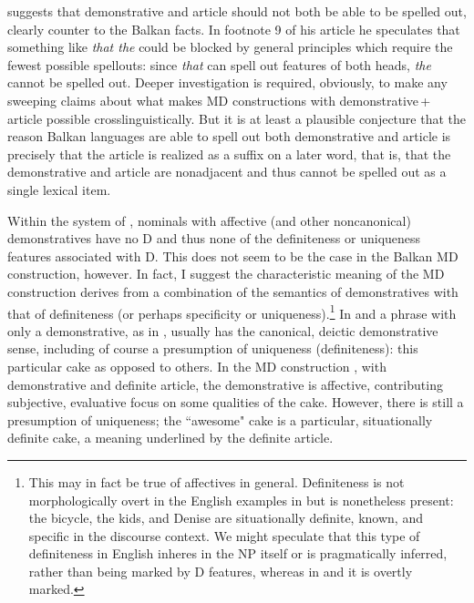 \documentclass[output=paper]{langscibook}
\begin{document}
\citet{Simik2016} suggests that demonstrative and article should not both be able to be spelled out, clearly counter to the Balkan  facts. In footnote 9 of his article he speculates that something like \textit{that the} could be blocked by general principles which require the fewest possible spellouts: since \textit{that} can spell out features of both heads, \textit{the} cannot be spelled out. Deeper investigation is required, obviously, to make any sweeping claims about what makes MD constructions with demonstrative\,+\,article possible crosslinguistically. But it is at least a plausible conjecture that the reason Balkan  languages are able to spell out both demonstrative and article is precisely that the article is realized as a suffix on a later word, that is, that the demonstrative and article are nonadjacent and thus cannot be spelled out as a single lexical item.

Within the system of \citet{Simik2016}, nominals with affective (and other noncanonical) demonstratives have no D and thus none of the definiteness or uniqueness features associated with D. This does not seem to be the case in the Balkan  MD construction, however. In fact, I suggest the characteristic meaning of the MD construction derives from a combination of the semantics of demonstratives with that of definiteness (or perhaps specificity or uniqueness).\footnote{This may in fact be true  of affectives in general. Definiteness is not morphologically overt in the English examples in  but is nonetheless present: the bicycle, the kids, and Denise are situationally definite, known, and specific in the discourse context. We might speculate that this type of definiteness in English inheres in the NP itself or is pragmatically inferred, rather than being marked by D features, whereas in  and  it is overtly marked.} In  and  a phrase with only a demonstrative, as in , usually has the canonical, deictic demonstrative sense, including of course a presumption of uniqueness (definiteness): this particular cake as opposed to others. In the MD construction , with demonstrative and definite article, the demonstrative is affective, contributing subjective, evaluative focus on some qualities of the cake. However, there is still a presumption of uniqueness; the ``awesome" cake is a particular, situationally definite cake, a meaning underlined by the definite article.
\end{document}

